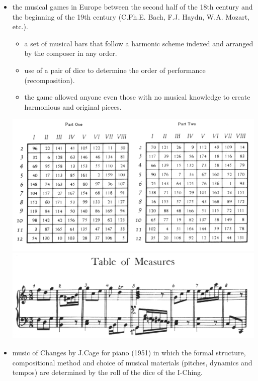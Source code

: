 \begin{itemize}
\tightlist
\item the musical games in Europe between the second half of the 18th century and the beginning of the 19th century (C.Ph.E. Bach, F.J. Haydn, W.A. Mozart, etc.).

  \begin{itemize}
  \tightlist
  \item a set of musical bars that follow a harmonic scheme indexed and arranged by the composer in any order.
  \item use of a pair of dice to determine the order of performance (recomposition).
  \item the game allowed anyone even those with no musical knowledge to create harmonious and original pieces.
  \end{itemize}
  
  \begin{center}
  \includegraphics[scale=0.7]{../img/mozart_tables.png}
  \includegraphics[scale=0.7]{../img/mozart_tables_1.png}
  \end{center}
  
\item music of Changes by J.Cage for piano (1951) in which the formal structure, compositional method and choice of musical materials (pitches, dynamics and tempos) are determined by the roll of the dice of the I-Ching.


\end{itemize}
